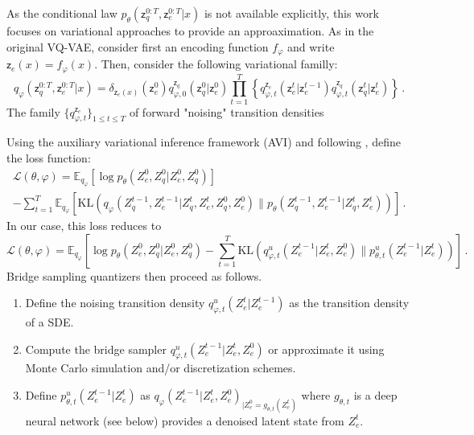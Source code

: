 \documentclass{article}
\newcommand{\latentdis}{\mathsf{z}_q}
\newcommand{\latentcont}{\mathsf{z}_e}
\begin{document}

As the conditional law $p_{\theta}(\latentdis^{0:T},\latentcont^{0:T}| x)$ is not available explicitly, this work focuses on  variational approaches to provide an approaximation. As in the original VQ-VAE, consider first an encoding function $f_\varphi$ and write $\latentcont(x)= f_\varphi(x)$. Then, consider the following variational familly:
$$
q_{\varphi}(\latentdis^{0:T},\latentcont^{0:T}| x) = \delta_{\latentcont(x)}(\latentcont^0)q_{\varphi,0}^{\latentdis}(\latentdis^0|\latentcont^0) \prod_{t=1}^T\left\{ q^{\latentcont}_{\varphi,t}(\latentcont^t|\latentcont^{t-1})q^{\latentdis}_{\varphi,t}(\latentdis^t|\latentcont^t)\right\}\,.
$$
The family $\{q^{\latentcont}_{\varphi,t}\}_{1\leqslant t \leqslant T}$  of forward "noising" transition densities





\clearpage
\newpage



Using the auxiliary variational inference framework (AVI) and following \cite{}, define the loss function:
\begin{multline*}
\mathcal{L}(\theta, \varphi) = \mathbb{E}_{q_\varphi} \left[ \log p_\theta(Z_e^{0},Z_q^{0}|Z_e^{0},Z_q^{0})\right]\\
 - \sum_{t=1}^{T}\mathbb{E}_{q_\varphi} \left[\mathrm{KL}(q_\varphi(Z_q^{t-1},Z_e^{t-1}|Z_q^t,Z_e^{t},Z_q^0,Z_e^{0})\|p_\theta(Z_q^{t-1},Z_e^{t-1}|Z_q^t,Z_e^t)) \right]\,.
\end{multline*}
In our case, this loss reduces to
$$
\mathcal{L}(\theta, \varphi) = \mathbb{E}_{q_\varphi} \left[ \log p_\theta(Z_e^{0},Z_q^{0}|Z_e^{0},Z_q^{0}) - \sum_{t=1}^{T}\mathrm{KL}(q^u_{\varphi,t}(Z_e^{t-1}|Z_e^{t},Z_e^{0})\|p^u_{\theta,t}(Z_e^{t-1}|Z_e^t)) \right]\,.
$$
Bridge sampling quantizers then proceed as follows.
\begin{enumerate}
\item Define the noising transition density $q^u_{\varphi,t}(Z_e^{t}|Z_e^{t-1})$ as the transition density of a SDE.
\item Compute the bridge sampler $q^u_{\varphi,t}(Z_e^{t-1}|Z_e^{t},Z_e^{0})$ or approximate it using Monte Carlo simulation and/or discretization schemes.
\item Define $p^u_{\theta,t}(Z_e^{t-1}|Z_e^t)$ as $q_\varphi(Z_e^{t-1}|Z_e^{t},Z_e^{0})_{|Z_e^{0} = g_{\theta,t}(Z_e^t)}$ where $g_{\theta,t}$ is a deep neural network (see below) provides a denoised latent state from $Z_e^t$.
\end{enumerate}
\end{document}

